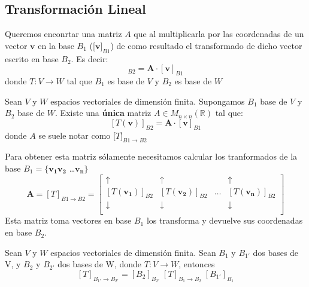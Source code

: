 \subsection{Transformación Lineal}\label{sec: trafoLineal}
Queremos enconrtar una matriz $A$ que al multiplicarla por las coordenadas de un
vector $\bm{v}$ en la base $B_1$ ([$\bm{v}]_{B1}$) de como resultado el transformado de
dicho vector escrito en base $B_2$. Es decir:
\begin{equation*}
    [T(\bm{v})]_{B2} = \bm{A} \cdot [\bm{v}]_{B1}
\end{equation*}
donde $T: V \rightarrow W$ tal que $B_1$ es base de $V$ y $B_2$ es base de $W$

\begin{teorema}
    Sean $V$ y $W$ espacios vectoriales de dimensión finita. Supongamos $B_1$
    base de $V$ y $B_2$ base de $W$. Existe una \textbf{única} matriz $A \in M_{n\times n}(\mathbb{R})$ tal que:
    \begin{equation}
        \label{eqn: matrizTransformación}
        [T(\bm{v})]_{B2} = \bm{A} \cdot [\bm{v}]_{B1}
    \end{equation}
    donde $A$ se suele notar como [$T]_{B1\rightarrow B2}$
\end{teorema}
Para obtener esta matriz sólamente necesitamos calcular los tranformados
de la base $B_1 = \{ \bm{v_1} \bm{v_2}$ \dots $\bm{v_n}\}$
\begin{equation}
    \bm{A} = [T]_{B1\rightarrow B2} = 
    \begin{bmatrix}
    \uparrow & \uparrow &  & \uparrow\\
    [T(\bm{v_1})]_{B2} & [T(\bm{v_2})]_{B2} & \dots & [T(\bm{v_n})]_{B2}\\
    \downarrow & \downarrow &  & \downarrow\\
    \end{bmatrix}
\end{equation}
Esta matriz toma vectores en base $B_1$ los transforma y devuelve sus coordenadas
en base $B_2$.\\

\begin{teorema}
    Sean $V$ y $W$ espacios vectoriales de dimensión finita. Sean
    $B_1$ y $B_{1'}$ dos bases de V, y $B_2$ y $B_{2'}$ dos bases 
    de W, donde $T: V \rightarrow W$, entonces
    \begin{equation}
        \label{eqn:camino}
        [T]_{B_{1'} \rightarrow B_{2'}} = [B_2]_{B_{2'}} \;
        [T]_{B_{1} \rightarrow B_{2}} \; [B_{1'}]_{B_1} 
    \end{equation}
\end{teorema}



